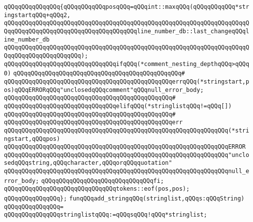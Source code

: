 \verb|qQQqqQQqqQQqqQQq{qQQqqQQqqQQqposqQQq=qQQqint::maxqQQq(qQQqqQQqqQQq*stringstartqQQq+qQQq2,|\newline
\verb|qQQqqQQqqQQqqQQqqQQqqQQqqQQqqQQqqQQqqQQqqQQqqQQqqQQqqQQqqQQqqQQqqQQqqQQqqQQqqQQqqQQqqQQqqQQqqQQqqQQqqQQqqQQqline_number_db::last_changeqQQqline_number_db|\newline
\verb|qQQqqQQqqQQqqQQqqQQqqQQqqQQqqQQqqQQqqQQqqQQqqQQqqQQqqQQqqQQqqQQqqQQqqQQqqQQqqQQqqQQqqQQqqQQq);|\newline
\newline
\verb|qQQqqQQqqQQqqQQqqQQqqQQqqQQqqQQqifqQQq(*comment_nesting_depthqQQq>qQQq0)|\newline
\verb|qQQqqQQqqQQqqQQqqQQqqQQqqQQqqQQqqQQqqQQqqQQqqQQq#|\newline
\verb|qQQqqQQqqQQqqQQqqQQqqQQqqQQqqQQqqQQqqQQqqQQqqQQqerrqQQq(*stringstart,pos)qQQqERRORqQQq"unclosedqQQqcomment"qQQqnull_error_body;|\newline
\verb|qQQqqQQqqQQqqQQqqQQqqQQqqQQqqQQqqQQqqQQqqQQqqQQq#|\newline
\verb|qQQqqQQqqQQqqQQqqQQqqQQqqQQqqQQqelifqQQq(*stringlistqQQq!=qQQq[])|\newline
\verb|qQQqqQQqqQQqqQQqqQQqqQQqqQQqqQQqqQQqqQQqqQQqqQQq#|\newline
\verb|qQQqqQQqqQQqqQQqqQQqqQQqqQQqqQQqqQQqqQQqqQQqqQQqerr|\newline
\verb|qQQqqQQqqQQqqQQqqQQqqQQqqQQqqQQqqQQqqQQqqQQqqQQqqQQqqQQqqQQqqQQq(*stringstart,qQQqpos)|\newline
\verb|qQQqqQQqqQQqqQQqqQQqqQQqqQQqqQQqqQQqqQQqqQQqqQQqqQQqqQQqqQQqqQQqERROR|\newline
\verb|qQQqqQQqqQQqqQQqqQQqqQQqqQQqqQQqqQQqqQQqqQQqqQQqqQQqqQQqqQQqqQQq"unclosedqQQqstring,qQQqcharacter,qQQqorqQQqquotation"|\newline
\verb|qQQqqQQqqQQqqQQqqQQqqQQqqQQqqQQqqQQqqQQqqQQqqQQqqQQqqQQqqQQqqQQqnull_error_body;|\newline
\verb|qQQqqQQqqQQqqQQqqQQqqQQqqQQqqQQqfi;|\newline
\newline
\verb|qQQqqQQqqQQqqQQqqQQqqQQqqQQqqQQqtokens::eof(pos,pos);|\newline
\verb|qQQqqQQqqQQqqQQq};|\newline
\newline
\newline
\verb|funqQQqadd_stringqQQq(stringlist,qQQqs:qQQqString)|\newline
\verb|qQQqqQQqqQQqqQQq=|\newline
\verb|qQQqqQQqqQQqqQQqstringlistqQQq:=qQQqsqQQq!qQQq*stringlist;|\newline
